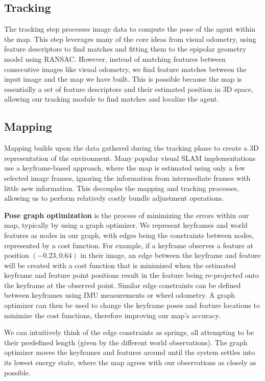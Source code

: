 \subsection{Tracking}
\label{sec:visual-slam-tracking}
The tracking step processes image data to compute the pose of the agent within the map. This step leverages many of the core ideas from visual odometry, using feature descriptors to find matches and fitting them to the epipolar geometry model using RANSAC. However, instead of matching features between consecutive images like visual odometry, we find feature matches between the input image and the map we have built. This is possible because the map is essentially a set of feature descriptors and their estimated position in 3D space, allowing our tracking module to find matches and localize the agent.

\subsection{Mapping}
\label{sec:visual-slam-mapping}
Mapping builds upon the data gathered during the tracking phase to create a 3D representation of the environment. Many popular visual SLAM implementations use a keyframe-based approach, where the map is estimated using only a few selected image frames, ignoring the information from intermediate frames with little new information. This decouples the mapping and tracking processes, allowing us to perform relatively costly bundle adjustment operations.

\textbf{Pose graph optimization} is the process of minimizing the errors within our map, typically by using a graph optimizer. We represent keyframes and world features as nodes in our graph, with edges being the constraints between nodes, represented by a cost function. For example, if a keyframe observes a feature at position $(-0.23,0.64)$ in their image, an edge between the keyframe and feature will be created with a cost function that is minimized when the estimated keyframe and feature point positions result in the feature being re-projected onto the keyframe at the observed point. Similar edge constraints can be defined between keyframes using IMU measurements or wheel odometry. A graph optimizer can then be used to change the keyframe poses and feature locations to minimize the cost functions, therefore improving our map's accuracy.

We can intuitively think of the edge constraints as springs, all attempting to be their predefined length (given by the different world observations). The graph optimizer moves the keyframes and features around until the system settles into its lowest energy state, where the map agrees with our observations as closely as possible.


